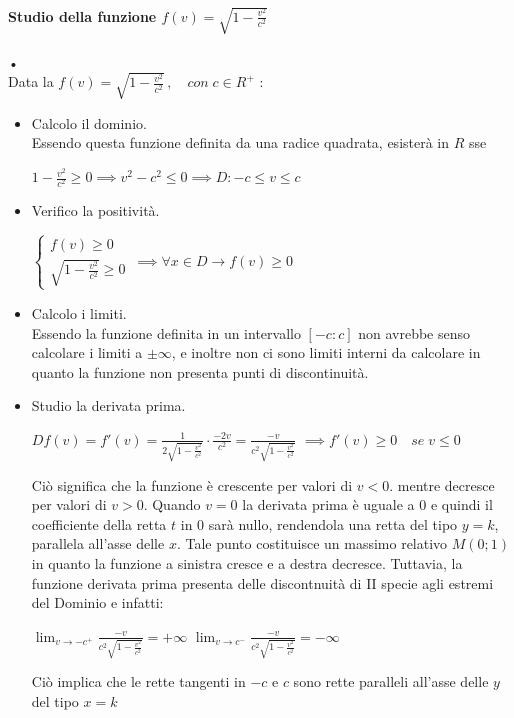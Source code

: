 \documentclass[a4paper,12pt]{report}
\begin{document}
\paragraph{Studio della funzione $f(v)= \sqrt{1- \frac{v^2}{c^2}}$} • \\
Data la $f(v)= \sqrt{1- \frac{v^2}{c^2}}\, , \quad con \; c \in R^+$ : \\
\begin{itemize}

\item Calcolo il dominio. \\
Essendo questa funzione definita da una radice quadrata, esisterà in $R$ sse 
\begin{center}
$1- \frac{v^2}{c^2} \geq 0 \implies v^2 -c^2 \leq 0 \implies D: -c \leq v \leq c$
\end{center}

\item Verifico la positività. \\
\begin{center}
      $\begin{cases}
        f(v) \geq 0\\
        \sqrt{1- \frac{v^2}{c^2}} \geq 0
      \end{cases}\, \implies \forall x \in D \to f(v) \geq 0 $
\end{center}

\item Calcolo i limiti. \\
Essendo la funzione definita in un intervallo $[-c:c]$ non avrebbe senso calcolare i limiti a $\pm \infty$, e inoltre non ci sono limiti interni da calcolare in quanto la funzione non presenta punti di discontinuità.

\item Studio la derivata prima.
\begin{center}
$Df(v) = f'(v) = \frac{1}{2\sqrt{1 - \frac{v^2}{c^2}}} \cdot \frac{-2v}{c^2} = \frac{-v}{c^2 \sqrt{1 - \frac{v^2}{c^2}}} $
$\implies f'(v) \geq 0 \quad se \; v \leq 0 $
\end{center}
Ciò significa che la funzione è crescente per valori di $v < 0$. mentre decresce per valori di $v > 0$. Quando $v=0$ la derivata prima è uguale a $0$ e quindi il coefficiente della retta $t$ in $0$ sarà nullo, rendendola una retta del tipo $y=k$, parallela all'asse delle $x$. Tale punto costituisce un massimo relativo $M(0;1)$ in quanto la funzione a sinistra cresce e a destra decresce.
Tuttavia, la funzione derivata prima presenta delle discontnuità di II specie agli estremi del Dominio e infatti: 
\begin{center}
$\lim_{v\to -c^+}\frac{-v}{c^2 \sqrt{1 - \frac{v^2}{c^2}}} = +\infty$ \qquad
$\lim_{v \to c^-}\frac{-v}{c^2 \sqrt{1 - \frac{v^2}{c^2}}} = -\infty$
\end{center}
Ciò implica che le rette tangenti in $-c$ e $c$ sono rette paralleli all'asse delle $y$ del tipo $x=k$


\end{itemize}
\end{document}
